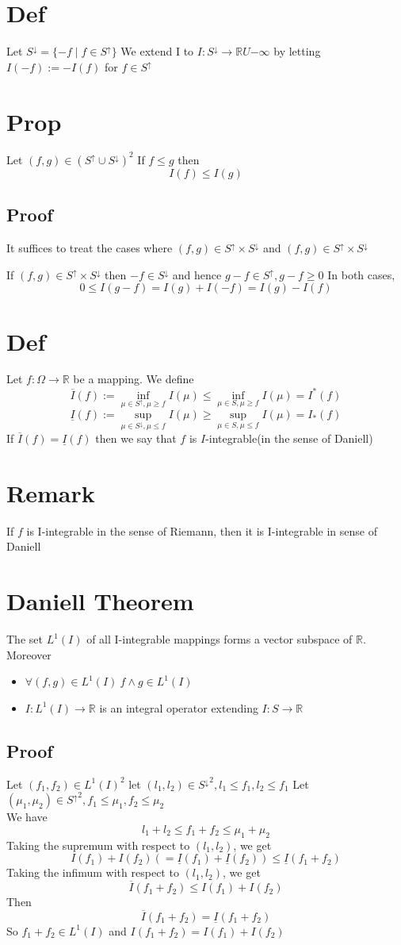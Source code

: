 \documentclass{book}
\begin{document}
\section{Def}
Let $S^\downarrow=\{-f\mid f\in S^\uparrow\}$
We extend I to $I:S^\downarrow\rightarrow\mathbb{R}U{-\infty}$
by letting $I(-f):=-I(f)$ for $f\in S^\uparrow$
\section{Prop}
Let $(f,g)\in (S^\uparrow\cup S^\downarrow)^2$ If $f\leq g$ then $$I(f)\leq I(g)$$
\subsection*{Proof}
It suffices to treat the cases where $(f,g)\in S^\uparrow\times S^\downarrow$ and $(f,g)\in S^\uparrow\times S^\downarrow$

If $(f,g)\in S^\uparrow\times S^\downarrow$ then $-f\in S^\downarrow$ and hence $g-f\in S^\uparrow,g-f\geq0$ In both cases, $$0\leq I(g-f)=I(g)+I(-f)=I(g)-I(f)$$
\section{Def}
Let $f:\Omega\rightarrow\mathbb{R}$ be a mapping. We define 
$$
\overline{I}(f):=\inf\limits_{\mu\in S^\uparrow,\mu\geq f}I(\mu)\leq\inf\limits_{\mu\in S,\mu\geq f}I(\mu)=I^*(f)$$
$$
\underline{I}(f):=\sup\limits_{\mu\in S^\downarrow,\mu\leq f}I(\mu)\geq\sup\limits_{\mu\in S,\mu\leq f}I(\mu)=I_*(f)$$
If $\overline{I}(f)=\underline{I}(f)$ then we say that $f$ is $I$-integrable(in the sense of Daniell)
\section{Remark}
If $f$ is I-integrable in the sense of Riemann, then it is I-integrable in sense of Daniell
\section{Daniell Theorem}
The set $L^1(I)$ of all I-integrable mappings forms a vector subspace of $\mathbb{R}$. Moreover
\begin{itemize}
    \item $\forall(f,g)\in L^1(I)\ f\wedge g\in L^1(I)$
    \item $I: L^1(I)\rightarrow\mathbb{R}$ is an integral operator extending $I:S\rightarrow\mathbb{R}$
\end{itemize}
\subsection*{Proof}
Let $(f_1,f_2)\in L^1(I)^2$ let $(l_1,l_2)\in {S^\downarrow}^2,l_1\leq f_1,l_2\leq f_1$ Let $(\mu_1,\mu_2)\in {S^\uparrow}^2, f_1\leq\mu_1,f_2\leq\mu_2$
\\We have $$l_1+l_2\leq f_1+f_2\leq \mu_1+\mu_2$$
Taking the supremum with respect to $(l_1,l_2)$, we get 
$$I(f_1)+I(f_2)(=\underline{I}(f_1)+\underline{I}(f_2))\leq\underline{I}(f_1+f_2)$$
Taking the infimum with respect to $(l_1,l_2)$, we get 
$$\overline{I}(f_1+f_2)\leq I(f_1)+I(f_2)$$
Then $$\overline{I}(f_1+f_2)=\underline{I}(f_1+f_2)$$
So $f_1+f_2\in L^1(I)$ and $I(f_1+f_2)=I(f_1)+I(f_2)$
\end{document}
